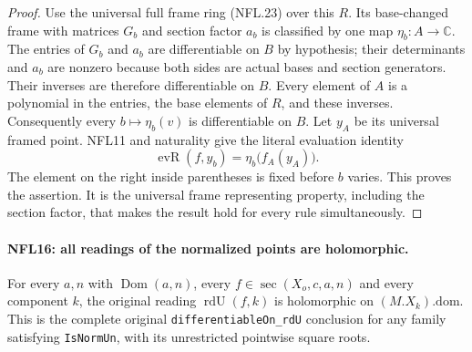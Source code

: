\documentclass[11pt,a4paper]{article}
\numberwithin{equation}{section}
\theoremstyle{remark}\newtheorem{remark}[theorem]{Remark}
\begin{document}
\begin{proof}
Use the universal full frame ring (NFL.23) over this $R$.
Its base-changed frame with matrices $G_b$ and section factor
$a_b$ is classified by one map $\eta_b:A\to\mathbb C$.
The entries of $G_b$ and $a_b$ are differentiable on $B$ by hypothesis;
their determinants and $a_b$ are nonzero because both sides
are actual bases and section generators.  Their inverses
are therefore differentiable on $B$.  Every element of $A$ is a
polynomial in the entries, the base elements of $R$, and these
inverses.  Consequently every $b\mapsto\eta_b(v)$ is differentiable on $B$.
Let $y_A$ be its universal framed point.  NFL11 and naturality
give the literal evaluation identity
\[
 \operatorname{evR}(f,y_b)=\eta_b\bigl(f_A(y_A)\bigr).
\]
The element on the right inside parentheses is fixed before
$b$ varies.  This proves the assertion.  It is the universal
frame representing property, including the section factor,
that makes the result hold for every rule simultaneously.
\end{proof}

\paragraph{NFL16: all readings of the normalized points are holomorphic.}
\label{claim:NFL16}
For every $a,n$ with $\operatorname{Dom}(a,n)$, every
$f\in\operatorname{sec}(X_o,c,a,n)$ and every component $k$,
the original reading $\operatorname{rdU}(f,k)$ is holomorphic
on $(M.X_k).\mathrm{dom}$.  This is the complete original
\texttt{differentiable\allowbreak On\_\allowbreak rd\allowbreak U} conclusion for any family satisfying
\texttt{Is\allowbreak Norm\allowbreak Un}, with its unrestricted pointwise square roots.
\end{document}
